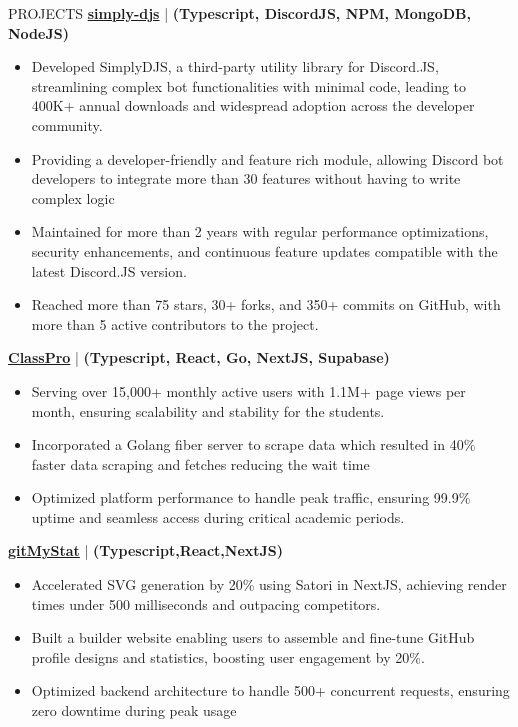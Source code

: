 \documentclass{resume} %
\begin{document}
\begin{rSection}{PROJECTS}    
    \textbf{\href{https://github.com/Rahuletto/simply-djs}{simply-djs}} | \textbf{(Typescript, DiscordJS, NPM, MongoDB, NodeJS)}
\begin{itemize}
\itemsep -3pt{}
\item Developed SimplyDJS, a third-party utility library for Discord.JS, streamlining complex bot functionalities with minimal code, leading to 400K+ annual downloads and widespread adoption across the developer community.
\item Providing a developer-friendly and feature rich module, allowing Discord bot developers to integrate more than 30 features without having to write complex logic
\item Maintained for more than 2 years with regular performance optimizations, security enhancements, and continuous feature updates compatible with the latest Discord.JS version.
\item Reached more than 75 stars, 30+ forks, and 350+ commits on GitHub, with more than 5 active contributors to the project.
\end{itemize}
\textbf{\href{https://github.com/Rahuletto/ClassPro}{ClassPro}} | \textbf{(Typescript, React, Go, NextJS, Supabase)}
\begin{itemize}
\itemsep -3pt{}
\item Serving over 15,000+ monthly active users with 1.1M+ page views per month, ensuring scalability and stability for the students.
\item Incorporated a Golang fiber server to scrape data which resulted in 40\% faster data scraping and fetches reducing the wait time
\item Optimized platform performance to handle peak traffic, ensuring 99.9\% uptime and seamless access during critical academic periods.
\end{itemize}
\textbf{\href{https://github.com/Rahuletto/gitMyStat}{gitMyStat}} | \textbf{(Typescript,React,NextJS)}
\begin{itemize}
\itemsep -3pt{}
\item Accelerated SVG generation by 20\% using Satori in NextJS, achieving render times under 500 milliseconds and outpacing competitors.
\item Built a builder website enabling users to assemble and fine-tune GitHub profile designs and statistics, boosting user engagement by 20\%.
\item Optimized backend architecture to handle 500+ concurrent requests, ensuring zero downtime during peak usage
\end{itemize}
\end{rSection}
\end{document}
